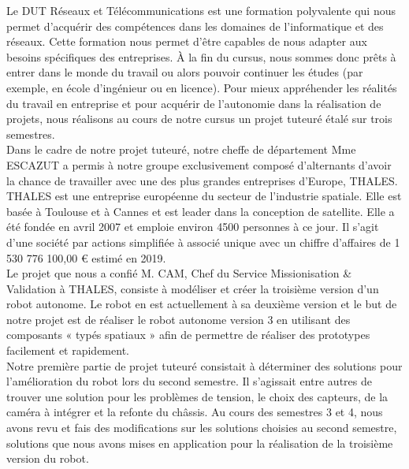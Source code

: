 \documentclass{PackagerQualityN}
\begin{document}
Le DUT Réseaux et Télécommunications est une formation polyvalente qui nous permet d’acquérir des compétences dans les domaines de l’informatique et des réseaux. Cette formation nous permet d’être capables de nous adapter aux besoins spécifiques des entreprises. À la fin du cursus, nous sommes donc prêts à entrer dans le monde du travail ou alors pouvoir continuer les études (par exemple, en école d’ingénieur ou en licence).
Pour mieux appréhender les réalités du travail en entreprise et pour acquérir de l’autonomie dans la réalisation de projets, nous réalisons au cours de notre cursus un projet tuteuré étalé sur trois semestres.\\

Dans le cadre de notre projet tuteuré, notre cheffe de département Mme ESCAZUT a permis à notre groupe exclusivement composé d’alternants d’avoir la chance de travailler avec une des plus grandes entreprises d’Europe, THALES.\\ 

THALES est une entreprise européenne du secteur de l’industrie spatiale. Elle est basée à Toulouse et à Cannes et est leader dans la conception de satellite. Elle a été fondée en avril 2007 et emploie environ 4500 personnes à ce jour. Il s’agit d’une société par actions simplifiée à associé unique avec un chiffre d’affaires de 1 530 776 100,00 € estimé en 2019.\\


Le projet que nous a confié M. CAM, Chef du Service Missionisation \& Validation à THALES, consiste à modéliser et créer la troisième version d’un robot autonome. Le robot en est actuellement à sa deuxième version et le but de notre projet est de réaliser le robot autonome version 3 en utilisant des composants « typés spatiaux » afin de permettre de réaliser des prototypes facilement et rapidement.\\

Notre première partie de projet tuteuré consistait à déterminer des solutions pour l’amélioration du robot lors du second semestre. Il s’agissait entre autres de trouver une solution pour les problèmes de tension, le choix des capteurs, de la caméra à intégrer et la refonte du châssis. Au cours des semestres 3 et 4, nous avons revu et fais des modifications sur les solutions choisies au second semestre, solutions que nous avons mises en application pour la réalisation de la troisième version du robot.\\
\end{document}
